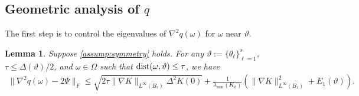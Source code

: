 \documentclass[11pt]{article}
\newtheorem{lemma}[theorem]{Lemma}
\theoremstyle{definition}
\numberwithin{theorem}{section}
\numberwithin{lemma}{section}
\numberwithin{equation}{section}
\def\dist{{\rm dist}}
\numberwithin{equation}{section}
\begin{document}
	\subsection{Geometric analysis of $q$}
	\label{sec:geometriclemmas}
	
	The first step is to control the eigenvalues of $\nabla^2q(\omega)$ for $\omega$ near $\vartheta$.
	
	\begin{lemma}
	\label{lem:approx2}
	Suppose \cref{assump:symmetry} holds. For any $\vartheta:=\{\theta_\ell\}_{\ell=1}^s$, $\tau\leq \Delta(\vartheta)/2$, and $\omega\in \Omega$ such that $\dist(\omega,\vartheta)\leq \tau$, we have
	\begin{align*}
		\|\nabla^2 q(\omega)-2 \Psi \|_F
		\leq \sqrt{2 \tau \|\nabla K\|_{L^\infty(B_\tau)} \Delta^2 K(0)} + \frac{1}{\lambda_{\min}(K_\vartheta)} \left(\|\nabla K\|_{L^\infty(B_\tau)}^2 + E_1(\vartheta) \right).
	\end{align*}
	\end{lemma}
	
\end{document}
